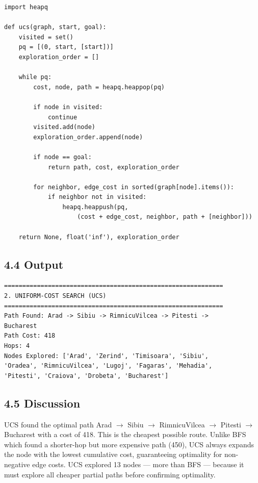 \documentclass[12pt,a4paper]{article}
\begin{document}
\begin{lstlisting}[style=plain, caption={Uniform-Cost Search}]
import heapq

def ucs(graph, start, goal):
    visited = set()
    pq = [(0, start, [start])]
    exploration_order = []

    while pq:
        cost, node, path = heapq.heappop(pq)

        if node in visited:
            continue
        visited.add(node)
        exploration_order.append(node)

        if node == goal:
            return path, cost, exploration_order

        for neighbor, edge_cost in sorted(graph[node].items()):
            if neighbor not in visited:
                heapq.heappush(pq,
                    (cost + edge_cost, neighbor, path + [neighbor]))

    return None, float('inf'), exploration_order
\end{lstlisting}

\subsection*{4.4 Output}

\begin{verbatim}
============================================================
2. UNIFORM-COST SEARCH (UCS)
============================================================
Path Found: Arad -> Sibiu -> RimnicuVilcea -> Pitesti ->
Bucharest
Path Cost: 418
Hops: 4
Nodes Explored: ['Arad', 'Zerind', 'Timisoara', 'Sibiu',
'Oradea', 'RimnicuVilcea', 'Lugoj', 'Fagaras', 'Mehadia',
'Pitesti', 'Craiova', 'Drobeta', 'Bucharest']
\end{verbatim}

\subsection*{4.5 Discussion}

UCS found the optimal path Arad $\rightarrow$ Sibiu $\rightarrow$ RimnicuVilcea $\rightarrow$ Pitesti $\rightarrow$ Bucharest with a cost of 418. This is the cheapest possible route. Unlike BFS which found a shorter-hop but more expensive path (450), UCS always expands the node with the lowest cumulative cost, guaranteeing optimality for non-negative edge costs. UCS explored 13 nodes --- more than BFS --- because it must explore all cheaper partial paths before confirming optimality.
\end{document}
